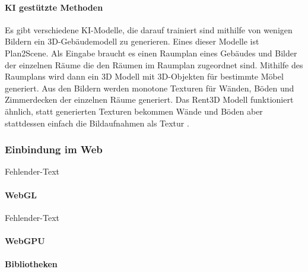 \paragraph{KI gestützte Methoden}
Es gibt verschiedene KI-Modelle, die darauf trainiert sind mithilfe von wenigen Bildern ein 3D-Gebäudemodell zu generieren. Eines dieser Modelle ist Plan2Scene. Als Eingabe braucht es einen Raumplan eines Gebäudes und Bilder der einzelnen Räume die den Räumen im Raumplan zugeordnet sind. Mithilfe des Raumplans wird dann ein 3D Modell mit 3D-Objekten für bestimmte Möbel generiert. Aus den Bildern werden monotone Texturen für Wänden, Böden und Zimmerdecken der einzelnen Räume generiert.\cite[S.~10733]{Plan2Scene2021} Das Rent3D Modell funktioniert ähnlich, statt generierten Texturen bekommen Wände und Böden aber stattdessen einfach die Bildaufnahmen als Textur \cite[S.~3413]{Rent3D2015}.

\subsubsection{Einbindung im Web}
Fehlender-Text

\paragraph{WebGL}
Fehlender-Text

\paragraph{WebGPU}

\paragraph{Bibliotheken}
